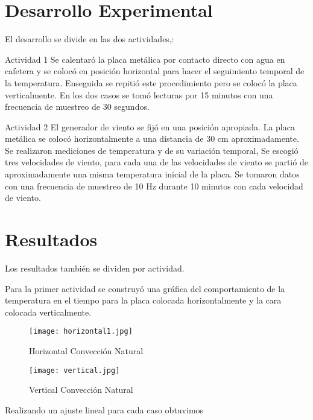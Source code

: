 \documentclass[12pt]{article}
\begin{document}
\section{Desarrollo Experimental}
\vspace{-0.5cm}
El desarrollo se divide en las dos actividades,:


Actividad 1 
Se calentaró la placa metálica por contacto directo con agua en cafetera y se colocó en posición horizontal para hacer el
seguimiento temporal de la temperatura. Enseguida se repitió este
procedimiento pero se colocó la placa verticalmente. En los dos
casos se tomó lecturas por 15 minutos con una frecuencia de muestreo de 30 segundos. 

Actividad 2 
El generador de viento se fijó en una posición apropiada. La placa metálica se colocó horizontalmente a una distancia de 30 cm aproximadamente.
Se realizaron mediciones de temperatura y de su variación temporal, 
Se escogió tres velocidades de viento, para cada una de las velocidades de viento se partió de aproximadamente una misma temperatura inicial de la placa. 
Se tomaron datos con una frecuencia de muestreo de 10 Hz durante 10 minutos con cada velocidad de viento.

\pagebreak
\section{Resultados}
Los resultados también se dividen por actividad.

Para la primer actividad se construyó una gráfica del comportamiento de la temperatura en el tiempo para la placa colocada horizontalmente y la cara colocada verticalmente.

\begin{figure}[H]
\begin{center}
\texttt{[image: horizontal1.jpg]}  
\caption{Horizontal Convección Natural}
\label{uno}
\end{center}
\end{figure}

\begin{figure}[H]
\begin{center}
\texttt{[image: vertical.jpg]}  
\caption{Vertical Convección Natural}
\label{uno}
\end{center}
\end{figure}

Realizando un ajuste lineal para cada caso obtuvimos
\end{document}
